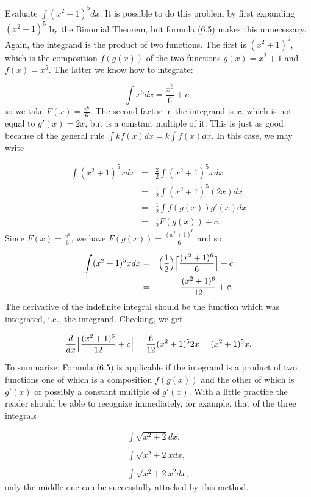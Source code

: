 \begin{example}
Evaluate $\int (x^2 + 1)^5 dx$. It is possible to do this problem by first expanding $(x^2 + 1)^5$ by the Binomial Theorem, but formula (6.5) makes this unnecessary. Again, the integrand is the product of two functions. The first is $(x^2 + 1)^5$, which is the composition $f(g(x))$ of the two functions $g(x) = x^2 + 1$ and $f(x) = x^5$. The latter we know how to integrate:

$$
\int x^5 dx = \frac{x^6}{6} + c,
$$
\noindent so we take $F(x) = \frac{x^6}{6}$. The second factor in the integrand is $x$, which is not equal to $g'(x) = 2x$, but is a constant multiple of it. This is just as good because of the general rule $\int kf (x) dx = k \int f (x) dx$. In this case, we may write

\begin{eqnarray*}
\int (x^2 + 1)^{5} x dx &=& \frac{2}{2} \int (x^2 + 1)^{5} xdx \\
&=& \frac{1}{2} \int (x^2 + 1)^{5}(2x)dx \\
&=& \frac{1}{2} \int f(g(x))g'(x) dx\\
&=& \frac{1}{2}F(g(x)) + c.
\end{eqnarray*}
\noindent Since $F(x) = \frac{x^6}{6}$, we have $F(g(x)) = \frac{(x^2 + 1)^6}{6}$ and so 

\begin{eqnarray*}
\int (x^2 + 1 )^{5} x dx 
&=& \Bigl( \frac{1}{2} \Bigr) \Bigl[ \frac{(x^2 + 1)^6}{6} \Bigr] + c\\
&=& \frac{(x^2 + 1)^6}{12} + c.
\end{eqnarray*}
\noindent The derivative of the indefinite integral should be the function which was integrated, i.e., the integrand. Checking, we get

$$
\frac{d}{dx} \Bigl[ \frac{(x^2 + 1)^6}{12} + c \Bigr] = \frac{6}{12}(x^2 + 1)^{5} 2x = (x^2 + 1)^{5}x.
$$
\end{example}

To summarize: Formula (6.5) is applicable if the integrand is a product of two functions one of which is a composition $f(g(x))$ and the other of which is $g'(x)$ or possibly a constant multiple of $g'(x)$. With a little practice the
reader should be able to recognize immediately, for example, that of the three integrals   

$$
\begin{array}{l}
\int \sqrt{x^2 + 2}dx,\\
\\
\int \sqrt{x^2 + 2}xdx,\\
\\
\int \sqrt{x^2 + 2}x^2dx,
\end{array}
$$
\noindent only the middle one can be successfully attacked by this method.

